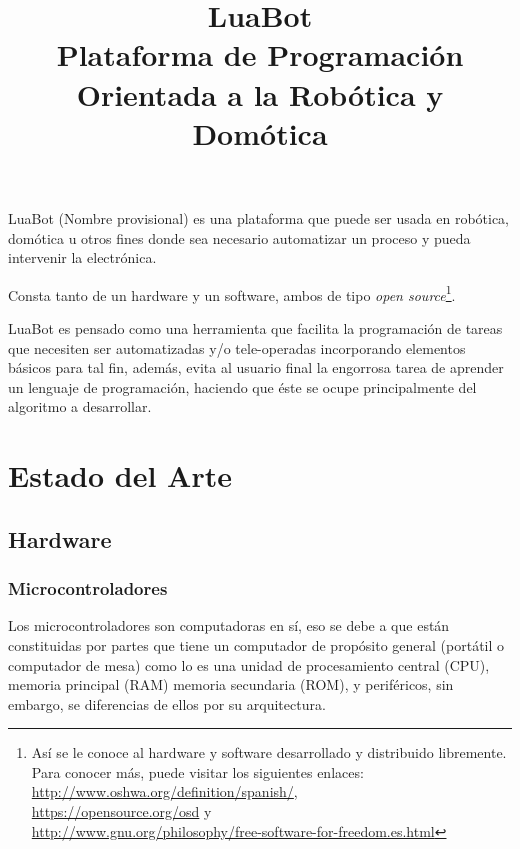 \documentclass{article}
\title{LuaBot\\Plataforma de Programación Orientada a la Robótica y Domótica}
\begin{document}
\maketitle
%

LuaBot (Nombre provisional) es una plataforma que puede ser usada en 
robótica, domótica u otros fines donde sea necesario automatizar un proceso
y pueda intervenir la electrónica.

Consta tanto de un hardware y un software, ambos de tipo 
\textit{open source}\footnote{Así se le conoce al hardware y software 
desarrollado y distribuido libremente. Para conocer más, puede visitar los
siguientes enlaces: \url{http://www.oshwa.org/definition/spanish/},\\ 
\url{https://opensource.org/osd} y \\
\url{http://www.gnu.org/philosophy/free-software-for-freedom.es.html}}. 

LuaBot es pensado como una herramienta que facilita la programación de 
tareas que necesiten ser automatizadas y/o tele-operadas incorporando
elementos básicos para tal fin, además, evita al usuario final la 
engorrosa tarea de aprender un lenguaje de programación, haciendo que éste
se ocupe principalmente del algoritmo a desarrollar.

\section{Estado del Arte}

\subsection{Hardware}

\subsubsection{Microcontroladores}

Los microcontroladores son computadoras en sí, eso se debe a que están
constituidas por partes que tiene un computador de propósito general
(portátil o computador de mesa) como lo es una unidad de procesamiento
central (CPU), memoria principal (RAM) memoria secundaria (ROM), y 
periféricos, sin embargo, se diferencias de ellos por su arquitectura. 
\end{document}
